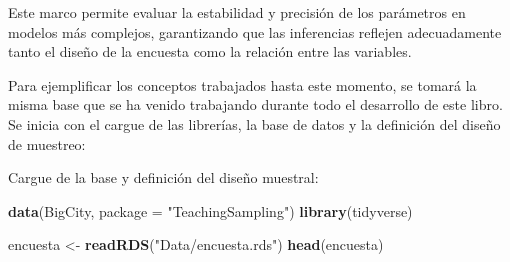 \documentclass[
  spanish,
  12pt,
]{book}
\newenvironment{Shaded}{\begin{snugshade}}{\end{snugshade}}
\newcommand{\AttributeTok}[1]{\textcolor[rgb]{0.13,0.29,0.53}{#1}}
\newcommand{\ConstantTok}[1]{\textcolor[rgb]{0.56,0.35,0.01}{#1}}
\newcommand{\DecValTok}[1]{\textcolor[rgb]{0.00,0.00,0.81}{#1}}
\newcommand{\FunctionTok}[1]{\textcolor[rgb]{0.13,0.29,0.53}{\textbf{#1}}}
\newcommand{\NormalTok}[1]{#1}
\newcommand{\OtherTok}[1]{\textcolor[rgb]{0.56,0.35,0.01}{#1}}
\newcommand{\SpecialCharTok}[1]{\textcolor[rgb]{0.81,0.36,0.00}{\textbf{#1}}}
\newcommand{\StringTok}[1]{\textcolor[rgb]{0.31,0.60,0.02}{#1}}
\begin{document}
Este marco permite evaluar la estabilidad y precisión de los parámetros en modelos más complejos, garantizando que las inferencias reflejen adecuadamente tanto el diseño de la encuesta como la relación entre las variables.

Para ejemplificar los conceptos trabajados hasta este momento, se tomará la misma base que se ha venido trabajando durante todo el desarrollo de este libro. Se inicia con el cargue de las librerías, la base de datos y la definición del diseño de muestreo:

\begin{Shaded}
\end{Shaded}

Cargue de la base y definición del diseño muestral:

\begin{Shaded}
\begin{Highlighting}[]
\FunctionTok{data}\NormalTok{(BigCity, }\AttributeTok{package =} \StringTok{"TeachingSampling"}\NormalTok{)}
\FunctionTok{library}\NormalTok{(tidyverse)}

\NormalTok{encuesta }\OtherTok{\textless{}{-}} \FunctionTok{readRDS}\NormalTok{(}\StringTok{"Data/encuesta.rds"}\NormalTok{)}
\FunctionTok{head}\NormalTok{(encuesta)}
\end{Highlighting}
\end{Shaded}
\end{document}
